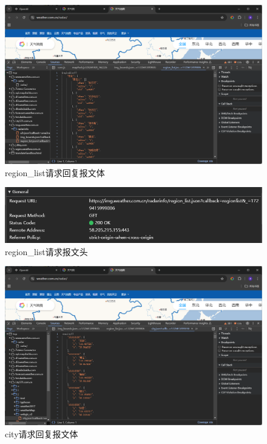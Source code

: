 \begin{figure}[!htbp]
    \centering
    \includegraphics[width=\textwidth]{figures/region_list_content.png}
    \caption{region\_list请求回复报文体}\label{regionlistcontent}
\end{figure}

\begin{figure}[!htbp]
    \centering
    \includegraphics[width=\textwidth]{figures/region_list_head.png}
    \caption{region\_list请求报文头}\label{regionlisthead}
\end{figure}

\begin{figure}[!htbp]
    \centering
    \includegraphics[width=\textwidth]{figures/city_js_content.png}
    \caption{city请求回复报文体}\label{cityjscontent}
\end{figure}

